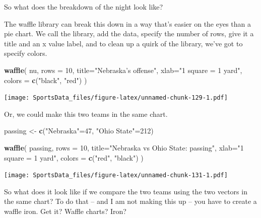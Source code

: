 \documentclass[
]{book}
\newenvironment{Shaded}{\begin{snugshade}}{\end{snugshade}}
\newcommand{\DataTypeTok}[1]{\textcolor[rgb]{0.13,0.29,0.53}{#1}}
\newcommand{\DecValTok}[1]{\textcolor[rgb]{0.00,0.00,0.81}{#1}}
\newcommand{\KeywordTok}[1]{\textcolor[rgb]{0.13,0.29,0.53}{\textbf{#1}}}
\newcommand{\NormalTok}[1]{#1}
\newcommand{\StringTok}[1]{\textcolor[rgb]{0.31,0.60,0.02}{#1}}
\begin{document}
So what does the breakdown of the night look like?

The waffle library can break this down in a way that's easier on the eyes than a pie chart. We call the library, add the data, specify the number of rows, give it a title and an x value label, and to clean up a quirk of the library, we've got to specify colors.

\begin{Shaded}
\begin{Highlighting}[]
\KeywordTok{waffle}\NormalTok{(}
\NormalTok{        nu, }
        \DataTypeTok{rows =} \DecValTok{10}\NormalTok{, }
        \DataTypeTok{title=}\StringTok{"Nebraska's offense"}\NormalTok{, }
        \DataTypeTok{xlab=}\StringTok{"1 square = 1 yard"}\NormalTok{, }
        \DataTypeTok{colors =} \KeywordTok{c}\NormalTok{(}\StringTok{"black"}\NormalTok{, }\StringTok{"red"}\NormalTok{)}
\NormalTok{)}
\end{Highlighting}
\end{Shaded}

\texttt{[image: SportsData\_files/figure-latex/unnamed-chunk-129-1.pdf]}

Or, we could make this two teams in the same chart.

\begin{Shaded}
\begin{Highlighting}[]
\NormalTok{passing <-}\StringTok{ }\KeywordTok{c}\NormalTok{(}\StringTok{"Nebraska"}\NormalTok{=}\DecValTok{47}\NormalTok{, }\StringTok{"Ohio State"}\NormalTok{=}\DecValTok{212}\NormalTok{)}
\end{Highlighting}
\end{Shaded}

\begin{Shaded}
\begin{Highlighting}[]
\KeywordTok{waffle}\NormalTok{(}
\NormalTok{        passing, }
        \DataTypeTok{rows =} \DecValTok{10}\NormalTok{, }
        \DataTypeTok{title=}\StringTok{"Nebraska vs Ohio State: passing"}\NormalTok{, }
        \DataTypeTok{xlab=}\StringTok{"1 square = 1 yard"}\NormalTok{, }
        \DataTypeTok{colors =} \KeywordTok{c}\NormalTok{(}\StringTok{"red"}\NormalTok{, }\StringTok{"black"}\NormalTok{)}
\NormalTok{)}
\end{Highlighting}
\end{Shaded}

\texttt{[image: SportsData\_files/figure-latex/unnamed-chunk-131-1.pdf]}

So what does it look like if we compare the two teams using the two vectors in the same chart? To do that -- and I am not making this up -- you have to create a waffle iron. Get it? Waffle charts? Iron?
\end{document}

